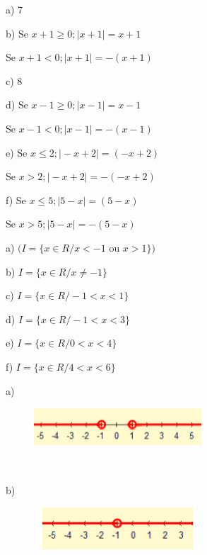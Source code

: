 \begin{respostas}{7}

	\ansitem{} a) 7 

	b) Se  \( x+1 \geq 0; \vert x+1 \vert =x+1 \) 

	Se  \( x+1<0; \vert x+1 \vert =- \left( x+1 \right)  \) 

	c) 8

	d) Se  \( x-1 \geq 0; \vert x-1 \vert =x-1 \) 

	Se  \( x-1<0; \vert x-1 \vert =- \left( x-1 \right)  \) 

	e) Se  \( x \leq 2; \vert -x+2 \vert = \left( -x+2 \right)  \) 

	Se  \( x>2; \vert -x+2 \vert =- \left( -x+2 \right)  \) 

	f) Se  \( x \leq 5; \vert 5-x \vert = \left( 5-x \right)  \) 

	Se  \( x>5; \vert 5-x \vert =- \left( 5-x \right)  \) 

	\ansitem a) $( I= \{ x \in R/x<-1 $ ou $ x>1 \}  )$ 

	b) \( I= \{ x \in R/x \neq -1 \}  \) 

	c) \( I= \{ x \in R/-1<x<1 \}  \) 

	d) \( I= \{ x \in R /-1<x<3 \}  \) 

	e) \(  I= \{ x \in R /0<x<4 \}  \) 

	f) \( I= \{ x \in R /4<x<6 \}  \) 

	\ansitem{} a) 

	\begin{figure}[H]
		\begin{Center}
			\includegraphics[width=2.47in,height=0.57in]{capitulos/outras_funcoes/media/image80.png}
		\end{Center}
	\end{figure}

~~

	b)

	\begin{figure}[H]
		\begin{Center}
			\includegraphics[width=2.47in,height=0.62in]{capitulos/outras_funcoes/media/image81.png}
		\end{Center}
	\end{figure}


\end{respostas}
